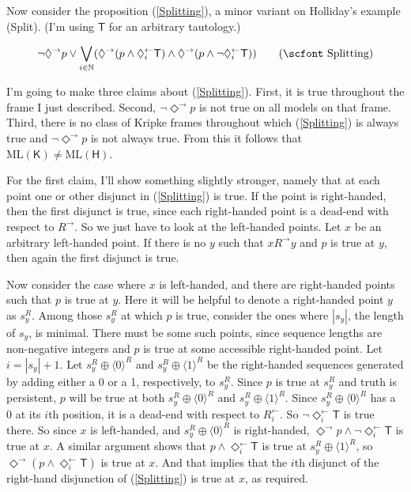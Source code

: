 \documentclass[
  11pt,
  letterpaper,
  DIV=11,
  numbers=noendperiod,
  twoside]{scrartcl}
\renewcommand{\textsc}[1]{{\scfont #1}}
\begin{document}
Now consider the proposition (\ref{Splitting}), a minor variant on
Holliday's example (\textsc{Split}). (I'm using \(\mathsf{T}\) for an
arbitrary tautology.)

\begin{equation}
\neg \Diamond^{\rightarrow} p
  \vee
\bigvee_{i \in \mathbb{N}}(
  \Diamond^{\rightarrow}
    (
      p
        \wedge
      \Diamond_i^{\leftarrow} \mathsf{T}
    )
  \wedge
  \Diamond^{\rightarrow}
    (
      p
        \wedge
      \neg \Diamond_i^{\leftarrow} \mathsf{T}
    )
  )
\tag{\textsc{Splitting}}
\label{Splitting}
\end{equation}

I'm going to make three claims about (\ref{Splitting}). First, it is
true throughout the frame I just described. Second,
\(\neg \Diamond^{\rightarrow} p\) is not true on all models on that
frame. Third, there is no class of Kripke frames throughout which
(\ref{Splitting}) is always true and \(\neg \Diamond^{\rightarrow} p\)
is not always true. From this it follows that
\(\mathrm{ML}(\mathsf{K}) \neq \mathrm{ML}(\mathsf{H})\).

For the first claim, I'll show something slightly stronger, namely that
at each point one or other disjunct in (\ref{Splitting}) is true. If the
point is right-handed, then the first disjunct is true, since each
right-handed point is a dead-end with respect to \(R^{\rightarrow}\). So
we just have to look at the left-handed points. Let \(x\) be an
arbitrary left-handed point. If there is no \(y\) such that
\(xR^{\rightarrow}y\) and \(p\) is true at \(y\), then again the first
disjunct is true.

Now consider the case where \(x\) is left-handed, and there are
right-handed points such that \(p\) is true at \(y\). Here it will be
helpful to denote a right-handed point \(y\) as \(s_y^R\). Among those
\(s_y^R\) at which \(p\) is true, consider the ones where \(|s_y|\), the
length of \(s_y\), is minimal. There must be some such points, since
sequence lengths are non-negative integers and \(p\) is true at some
accessible right-handed point. Let \(i = |s_y| + 1\). Let
\(s_y^R \oplus \langle 0 \rangle^R\) and
\(s_y^R \oplus \langle 1 \rangle^R\) be the right-handed sequences
generated by adding either a 0 or a 1, respectively, to \(s_y^R\). Since
\(p\) is true at \(s_y^R\) and truth is persistent, \(p\) will be true
at both \(s_y^R \oplus \langle 0 \rangle^R\) and
\(s_y^R \oplus \langle 1 \rangle^R\). Since
\(s_y^R \oplus \langle 0 \rangle^R\) has a 0 at its \(i\)th position, it
is a dead-end with respect to \(R^{\leftarrow}_i\). So
\(\neg \Diamond_i^{\leftarrow} \mathsf{T}\) is true there. So since
\(x\) is left-handed, and \(s_y^R\oplus \langle 0 \rangle^R\) is
right-handed,
\(\Diamond^{\rightarrow} p \wedge \neg \Diamond_i^{\leftarrow} \mathsf{T}\)
is true at \(x\). A similar argument shows that
\(p \wedge \Diamond_i^{\leftarrow} \mathsf{T}\) is true at
\(s_y^R\oplus \langle 1 \rangle^R\), so
\(\Diamond^{\rightarrow}(p \wedge \Diamond_i^{\leftarrow} \mathsf{T})\)
is true at \(x\). And that implies that the \(i\)th disjunct of the
right-hand disjunction of (\ref{Splitting}) is true at \(x\), as
required.
\end{document}
